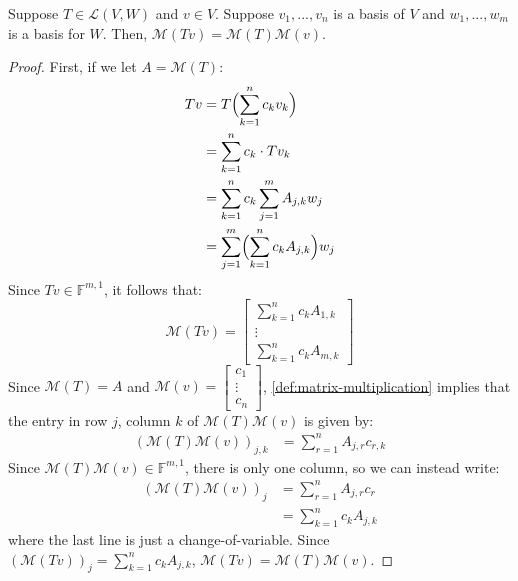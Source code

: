 \documentclass{article}
\begin{document}
\begin{theorem}
  \label{thm:linear-maps-as-matrix-multiplication}
  Suppose $T \in \mathcal{L}(V, W)$ and $v \in V$. Suppose $v_1, ...,
  v_n$ is a basis of $V$ and $w_1, ..., w_m$ is a basis for $W$. Then,
  $\mathcal{M}(Tv) = \mathcal{M}(T)\mathcal{M}(v)$.
\end{theorem}
\begin{proof}
  First, if we let $A = \mathcal{M}(T)$:
  \begin{align*}
    Tv &= T\Bigl( \sum_{k=1}^n c_k v_k \Bigr) \\
       &= \sum_{k=1}^n c_k \cdot Tv_k \\
       &= \sum_{k=1}^n c_k \sum_{j=1}^m A_{j,k} w_j \\
    &= \sum_{j=1}^m \Bigl( \sum_{k=1}^n c_k A_{j,k} \Bigr) w_j
  \end{align*}
  Since $Tv \in \mathbb{F}^{m,1}$, it follows that:
  \[
    \mathcal{M}(Tv) = \begin{bmatrix}
      \sum_{k=1}^n c_k A_{1,k} \\
      \vdots \\
      \sum_{k=1}^n c_k A_{m,k}
    \end{bmatrix}
  \]
  Since $\mathcal{M}(T) = A$ and $\mathcal{M}(v) = \begin{bmatrix} c_1
    \\ \vdots \\ c_n \end{bmatrix}$, \cref{def:matrix-multiplication}
  implies that the entry in row $j$, column $k$ of $\mathcal{M}(T)
  \mathcal{M}(v)$ is given by:
  \begin{align*}
    (\mathcal{M}(T) \mathcal{M}(v))_{j,k} &= \sum_{r=1}^n A_{j,r}c_{r,k}
  \end{align*}
  Since $\mathcal{M}(T) \mathcal{M}(v) \in \mathbb{F}^{m,1}$, there is
  only one column, so we can instead write:
   \begin{align*}
     (\mathcal{M}(T) \mathcal{M}(v))_j &= \sum_{r=1}^n A_{j,r}c_r \\
     &= \sum_{k=1}^n c_k A_{j,k}
   \end{align*}
   where the last line is just a change-of-variable. Since
   $(\mathcal{M}(Tv))_j = \sum_{k=1}^n c_k A_{j, k}$, $\mathcal{M}(Tv)
   = \mathcal{M}(T) \mathcal{M}(v)$.
\end{proof}
\end{document}
